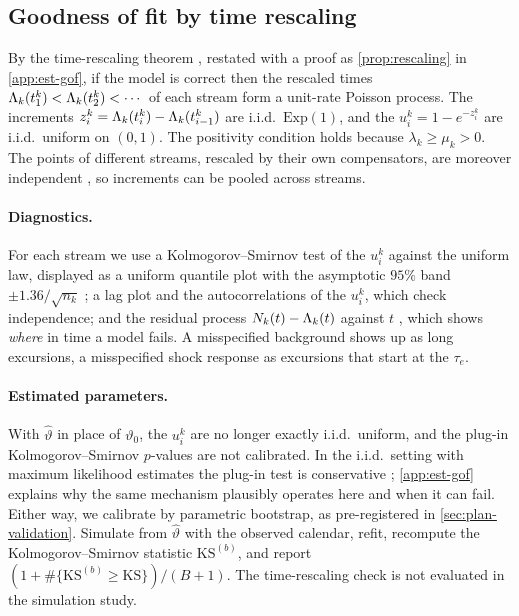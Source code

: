 \subsection{Goodness of fit by time rescaling}\label{sec:est-gof}

By the time-rescaling theorem \citep{papangelou1972,brown2002}, restated with a proof as
\cref{prop:rescaling} in \cref{app:est-gof}, if the model is correct then the rescaled
times $\Lambda_k(t^k_1)<\Lambda_k(t^k_2)<\cdots$ of each stream form a unit-rate Poisson process.
The increments $z^k_i=\Lambda_k(t^k_i)-\Lambda_k(t^k_{i-1})$ are i.i.d.\ $\mathrm{Exp}(1)$, and the
$u^k_i=1-e^{-z^k_i}$ are i.i.d.\ uniform on $(0,1)$. The positivity condition holds because
$\lambda_k\ge\mu_k>0$. The points of different streams, rescaled by their own compensators,
are moreover independent \citep{meyer1971,brown1988}, so increments can be pooled across
streams.

\paragraph{Diagnostics.} For each stream we use a Kolmogorov--Smirnov test of the $u^k_i$
against the uniform law, displayed as a uniform quantile plot with the asymptotic $95\%$
band $\pm1.36/\sqrt{n_k}$ \citep{brown2002}; a lag plot and the autocorrelations of the
$u^k_i$, which check independence; and the residual process $N_k(t)-\Lambda_k(t)$ against
$t$ \citep{ogata1988}, which shows \emph{where} in time a model fails. A misspecified
background shows up as long excursions, a misspecified shock response as excursions that
start at the $\tau_e$.

\paragraph{Estimated parameters.} With $\hat\vartheta$ in place of $\vartheta_0$, the
$u^k_i$ are no longer exactly i.i.d.\ uniform, and the plug-in Kolmogorov--Smirnov
$p$-values are not calibrated. In the i.i.d.\ setting with maximum likelihood estimates the
plug-in test is conservative \citep{durbin1973,lilliefors1967}; \cref{app:est-gof} explains
why the same mechanism plausibly operates here and when it can fail. Either way, we
calibrate by parametric bootstrap, as pre-registered in \cref{sec:plan-validation}. Simulate
from $\hat\vartheta$ with the observed calendar, refit, recompute the Kolmogorov--Smirnov
statistic $\mathrm{KS}^{(b)}$, and report $(1+\#\{\mathrm{KS}^{(b)}\ge\mathrm{KS}\})/(B+1)$.
The time-rescaling check is not evaluated in the simulation study.

